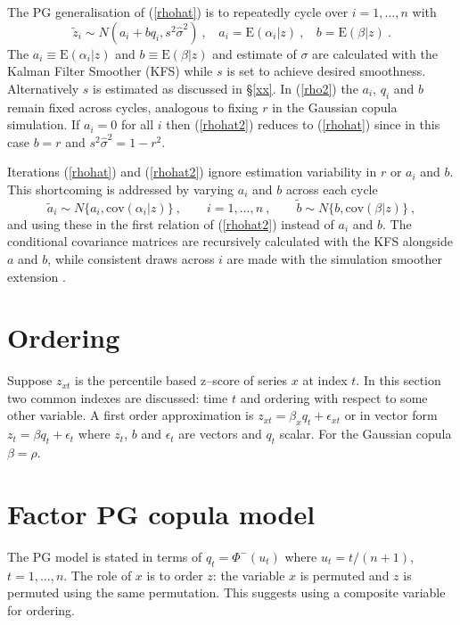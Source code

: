 \documentclass[authoryear]{elsarticle}
\newcommand{\E}{\mathrm{E}}
\newcommand{\cov}{\mathrm{cov}}
\newcommand{\eps}{\epsilon}
\newcommand{\eref}[1]{(\ref{#1})}
\newcommand{\sref}[1]{\S\ref{#1}}
\newcommand{\cq}{\ , \qquad}
\newcommand{\be}[1]{\begin{equation}\label{#1}}
\newcommand{\ee}{\end{equation}}
\begin{document}
The PG generalisation of \eref{rhohat} is to repeatedly cycle over  $i=1,\ldots,n$ with 
\be{rhohat2}
\tilde z_i\sim N(a_i+bq_i, s^2\hat\sigma^2)\ , \ \ \ \  a_i=\E(\alpha_i|  z)\ , \ \ \ \ b=\E(\beta|  z)\ .
\ee
The $a_i\equiv\E(\alpha_i|z)$ and $b\equiv\E(\beta|z)$ and estimate of $\sigma$ are calculated with the Kalman Filter Smoother (KFS)  \citep{DeJong:91a} while $s$ is set to achieve desired smoothness.  Alternatively $s$ is estimated as discussed in \sref{xx}.  In  \eref{rho2} the $a_i$, $q_i$  and $b$ remain fixed across cycles, analogous to fixing $r$  in the  Gaussian copula simulation.  If $a_i=0$ for all $i$ then \eref{rhohat2} reduces to \eref{rhohat} since in this case $b=r$ and $s^2\hat\sigma^2=1-r^2$. 

Iterations \eref{rhohat} and \eref{rhohat2}  ignore  estimation variability in $r$ or $a_i$ and $b$.  This shortcoming is addressed by varying  $a_i$ and $b$  across  each cycle 
$$
\tilde a_i \sim N\{a_i,\cov(\alpha_i|  z)\}\cq i=1,\ldots,n\cq  \tilde b\sim N\{b,\cov(\beta|  z)\}\ ,
$$
and using these  in the first relation of \eref{rhohat2}  instead of $a_i$ and $b$.
The conditional covariance matrices are recursively calculated  with the KFS alongside $a$ and $b$, while consistent  draws  across $i$  are made with the 
simulation smoother extension  \citep{DeJong&Shephard:95}. 

\section{Ordering}

Suppose $z_{xt}$ is the percentile based z--score of series $x$ at index $t$.   In this section two common indexes are discussed:   time $t$ and ordering with respect to some other variable.    A first order approximation is $z_{xt} = \beta_xq_t + \eps_{xt}$ or in vector form $z_t=\beta q_t + \eps_t$ where $z_t$, $b$ and $\eps_t$ are vectors and $q_t$ scalar.   For the Gaussian copula $\beta=\rho$.

\section{Factor PG copula model}

The PG  model is stated in terms of  $q_t=\Phi^-(u_t)$ where $u_t=t/(n+1)$, $t=1,\ldots,n$.   The  role of $x$  is to order $z$:  the variable $x$ is permuted  and $z$ is permuted using the same permutation.   This suggests using a composite variable for ordering.
\end{document}
